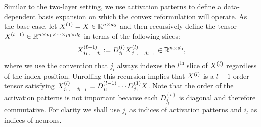 Similar to the two-layer setting, we use activation patterns to define
a data-dependent basis expansion on which the convex reformulation will
operate.
As the base case, let \( X^{(1)} = X \in \mathbb{R}^{n \times d_0} \) and then
recursively define the tensor 
\( X^{(l+1)} \in \mathbb{R}^{n \times p_1 \times \cdots \times p_{l} \times d_0} \)
in terms of the following slices:
\begin{equation}\label{eq:data-tensor}
    X^{(l+1)}_{j_1,\ldots, j_l}
    := D^{(l)}_{j_l} X^{(l)}_{j_1, \ldots, j_{l-1}} \in \mathbb{R}^{n \times d_0},
\end{equation}
where we use the convention that \( j_{l} \) always indexes the
\( l^{\text{th}} \) slice of \( X^{(l)} \) regardless of the index
position.
Unrolling this recursion implies that \( X^{(l)} \) is a \( l+1 \) order tensor
satisfying
\( X^{(l)}_{j_1, \ldots, j_{l-1}} = D^{(l-1)}_{j_{l-1}} \cdots D^{(1)}_{j_1} X \).
Note that the order of the activation patterns is not important because
each \( D^{(l)}_{j_l} \) is diagonal and therefore commutative.
For clarity we shall use \( j_l \) as indices of activation patterns
and \( i_l \) as indices of neurons.

